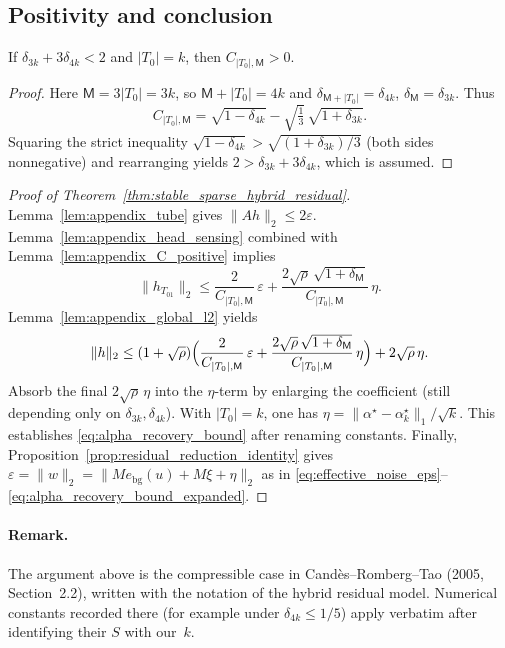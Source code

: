 \subsection{Positivity and conclusion}

\begin{lemma}
\label{lem:appendix_C_positive}
If $\delta_{3k}+3\delta_{4k}<2$ and $|T_0|=k$, then $C_{|T_0|,\mathsf{M}}>0$.
\end{lemma}

\begin{proof}
Here $\mathsf{M}=3|T_0|=3k$, so $\mathsf{M}+|T_0|=4k$ and $\delta_{\mathsf{M}+|T_0|}=\delta_{4k}$, $\delta_{\mathsf{M}}=\delta_{3k}$.
Thus
\[
  C_{|T_0|,\mathsf{M}}
  =
  \sqrt{1-\delta_{4k}} - \sqrt{\tfrac{1}{3}}\,\sqrt{1+\delta_{3k}}.
\]
Squaring the strict inequality $\sqrt{1-\delta_{4k}}>\sqrt{(1+\delta_{3k})/3}$ (both sides nonnegative) and rearranging yields $2>\delta_{3k}+3\delta_{4k}$, which is assumed.
\end{proof}

\begin{proof}[Proof of Theorem~\ref{thm:stable_sparse_hybrid_residual}]
Lemma~\ref{lem:appendix_tube} gives $\|Ah\|_2\le 2\varepsilon$.
Lemma~\ref{lem:appendix_head_sensing} combined with Lemma~\ref{lem:appendix_C_positive} implies
\[
  \|h_{T_{01}}\|_2
  \le
  \frac{2}{C_{|T_0|,\mathsf{M}}}\,\varepsilon
  +
  \frac{2\sqrt{\rho}\,\sqrt{1+\delta_{\mathsf{M}}}}{C_{|T_0|,\mathsf{M}}}\,\eta.
\]
Lemma~\ref{lem:appendix_global_l2} yields
\[
  \|h\|_2
  \le
  (1+\sqrt{\rho})\Bigl(\frac{2}{C_{|T_0|,\mathsf{M}}}\,\varepsilon + \frac{2\sqrt{\rho}\,\sqrt{1+\delta_{\mathsf{M}}}}{C_{|T_0|,\mathsf{M}}}\,\eta\Bigr)
  +
  2\sqrt{\rho}\,\eta.
\]
Absorb the final $2\sqrt{\rho}\,\eta$ into the $\eta$-term by enlarging the coefficient (still depending only on $\delta_{3k},\delta_{4k}$).
With $|T_0|=k$, one has $\eta=\|\alpha^\star-\alpha^\star_k\|_1/\sqrt{k}$.
This establishes \eqref{eq:alpha_recovery_bound} after renaming constants.
Finally, Proposition~\ref{prop:residual_reduction_identity} gives $\varepsilon=\|w\|_2=\|M e_{\mathrm{bg}}(u)+M\xi+\eta\|_2$ as in \eqref{eq:effective_noise_eps}--\eqref{eq:alpha_recovery_bound_expanded}.
\end{proof}

\paragraph{Remark.}
The argument above is the compressible case in Cand\`es--Romberg--Tao (2005, Section~2.2), written with the notation of the hybrid residual model.
Numerical constants recorded there (for example under $\delta_{4k}\le 1/5$) apply verbatim after identifying their $S$ with our~$k$.
